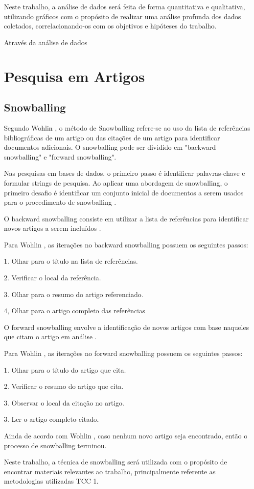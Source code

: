 Neste trabalho, a análise de dados será feita de forma quantitativa e qualitativa, utilizando gráficos com o propósito de realizar uma análise profunda dos dados coletados, correlacionando-os com os objetivos e hipóteses do trabalho. 

Através da análise de dados

\section{Pesquisa em Artigos}

\subsection{Snowballing}

Segundo Wohlin \cite{wohlin2014guidelines}, o método de Snowballing refere-se ao uso da lista de referências bibliográficas de um artigo ou das citações de um artigo para identificar documentos adicionais. O snowballing pode ser dividido em "backward snowballing" e "forward snowballing".

Nas pesquisas em bases de dados, o primeiro passo é identificar palavras-chave e formular strings de pesquisa. Ao aplicar uma abordagem de snowballing, o primeiro desafio é identificar um conjunto inicial de documentos a serem usados para o procedimento de snowballing \cite{wohlin2014guidelines}.

O backward snowballing consiste em utilizar a lista de referências para identificar novos artigos a serem incluídos \cite{wohlin2014guidelines}.

Para Wohlin \cite{wohlin2014guidelines}, as iterações no backward snowballing possuem os seguintes passos:

1. Olhar para o título na lista de referências.

2. Verificar o local da referência.

3. Olhar para o resumo do artigo referenciado.

4, Olhar para o artigo completo das referências

O forward snowballing envolve a identificação de novos artigos com base naqueles que citam o artigo em análise \cite{wohlin2014guidelines}.

Para Wohlin \cite{wohlin2014guidelines}, as iterações no forward snowballing possuem os seguintes passos:

1. Olhar para o título do artigo que cita.

2. Verificar o resumo do artigo que cita.

3. Observar o local da citação no artigo.

3. Ler o artigo completo citado.

Ainda de acordo com Wohlin \cite{wohlin2014guidelines}, caso nenhum novo artigo seja encontrado, então o processo de snowballing terminou.

Neste trabalho, a técnica de snowballing será utilizada com o propósito de encontrar materiais relevantes ao trabalho, principalmente referente as metodologias utilizadas TCC 1.

